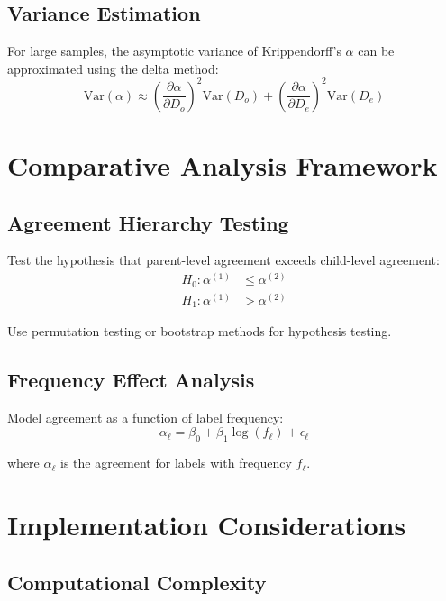 \documentclass[11pt]{article}
\begin{document}
\subsection{Variance Estimation}

For large samples, the asymptotic variance of Krippendorff's $\alpha$ can be approximated using the delta method:
\begin{equation}
\text{Var}(\alpha) \approx \left(\frac{\partial \alpha}{\partial D_o}\right)^2 \text{Var}(D_o) + \left(\frac{\partial \alpha}{\partial D_e}\right)^2 \text{Var}(D_e)
\end{equation}

\section{Comparative Analysis Framework}

\subsection{Agreement Hierarchy Testing}

Test the hypothesis that parent-level agreement exceeds child-level agreement:
\begin{align}
H_0: \alpha^{(1)} &\leq \alpha^{(2)} \\
H_1: \alpha^{(1)} &> \alpha^{(2)}
\end{align}

Use permutation testing or bootstrap methods for hypothesis testing.

\subsection{Frequency Effect Analysis}

Model agreement as a function of label frequency:
\begin{equation}
\alpha_\ell = \beta_0 + \beta_1 \log(f_\ell) + \epsilon_\ell
\end{equation}

where $\alpha_\ell$ is the agreement for labels with frequency $f_\ell$.

\section{Implementation Considerations}

\subsection{Computational Complexity}
\end{document}

